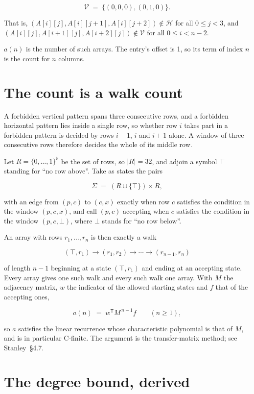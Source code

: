 \documentclass[11pt]{article}
\theoremstyle{definition}
\begin{document}
\[\mathcal{V} \;=\; \{(0,0,0), (0,1,0)\}.\]

That is, $(A[i][j],A[i][j{+}1],A[i][j{+}2]) \notin \mathcal{H}$ for all $0 \le j < 3$, and $(A[i][j],A[i{+}1][j],A[i{+}2][j]) \notin \mathcal{V}$ for all $0 \le i < n-2$.

$a(n)$ is the number of such arrays. The entry's offset is 1, so its term of index $n$ is the count for $n$ columns.

\section{The count is a walk count}

A forbidden vertical pattern spans three consecutive rows, and a forbidden horizontal pattern lies inside a single row, so whether row $i$ takes part in a forbidden pattern is decided by rows $i-1$, $i$ and $i+1$ alone. A window of three consecutive rows therefore decides the whole of its middle row.

Let $R = \{0,\dots,1\}^{5}$ be the set of rows, so $|R| = 32$, and adjoin a symbol $\top$ standing for ``no row above''. Take as states the pairs

\[\Sigma \;=\; (R \cup \{\top\}) \times R,\]

with an edge from $(p,c)$ to $(c,x)$ exactly when row $c$ satisfies the condition in the window $(p,c,x)$, and call $(p,c)$ accepting when $c$ satisfies the condition in the window $(p,c,\bot)$, where $\bot$ stands for ``no row below''.

An array with rows $r_1,\dots,r_n$ is then exactly a walk

\[(\top,r_1) \to (r_1,r_2) \to \cdots \to (r_{n-1},r_n)\]

of length $n-1$ beginning at a state $(\top,r_1)$ and ending at an accepting state. Every array gives one such walk and every such walk one array. With $M$ the adjacency matrix, $w$ the indicator of the allowed starting states and $f$ that of the accepting ones,

\[a(n) \;=\; w^{\mathsf T} M^{\,n-1} f \qquad (n \ge 1),\]

so $a$ satisfies the linear recurrence whose characteristic polynomial is that of $M$, and is in particular C-finite. The argument is the transfer-matrix method; see Stanley~\S4.7.

\section{The degree bound, derived}
\end{document}
